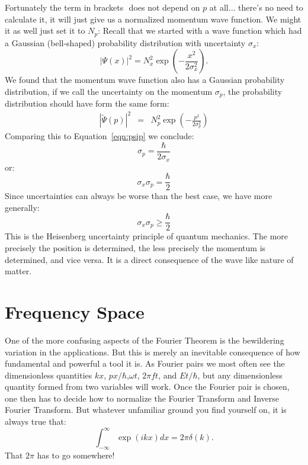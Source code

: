 \documentclass[12pt]{article}
\begin{document}
Fortunately the term in brackets ${}$ does not depend on $p$ at all... there's no need to calculate it, it will just give us a normalized momentum wave function.  We might it as well just set it to $N_p$:
Recall that we started with a wave function which had a Gaussian (bell-shaped) probability distribution with uncertainty $\sigma_x$:
\begin{displaymath}
|\Psi(x)|^2 = N_x^2 \exp\left(-\frac{x^2}{2\sigma_x^2}\right).
\end{displaymath}
We found that the momentum wave function also has a Gaussian probability distribution, if we call the uncertainty on the momentum $\sigma_p$, the probability distribution should have form the same form:
\begin{eqnarray*}
|\widetilde{\Psi}(p) |^2 &=& N_p^2 \exp\left(-\frac{p^2}{2 \sigma_p^2} \right)
\end{eqnarray*}
Comparing this to Equation~\ref{eqn:psip} we conclude:
\begin{displaymath}
\sigma_p = \frac{\hbar}{2 \sigma_x}
\end{displaymath}
or:
\begin{displaymath}
\sigma_x \sigma_p = \frac{\hbar}{2}
\end{displaymath}
Since uncertainties can always be worse than the best case, we have more generally:
\begin{displaymath}
\sigma_x \sigma_p \geq \frac{\hbar}{2}
\end{displaymath}
This is the Heisenberg uncertainty principle of quantum mechanics.  The more precisely the position is determined, the less precisely the momentum is determined, and vice versa.  It is a direct consequence of the wave like nature of matter.

\section{Frequency Space}

One of the more confusing aspects of the Fourier Theorem is the bewildering variation in the applications.  But this is merely an inevitable consequence of how fundamental and powerful a tool it is.  As Fourier pairs we most often see the dimensionless quantities $kx$, $px/\hbar$,$\omega t$, $2\pi f t$, and $Et/\hbar$, but any dimensionless quantity formed from two variables will work.  Once the Fourier pair is chosen, one then has to decide how to normalize the Fourier Transform and Inverse Fourier Transform.  But whatever unfamiliar ground you find yourself on, it is always true that:
\begin{displaymath}
\int^{\infty}_{-\infty} \exp(ikx) dx = 2\pi \delta(k).
\end{displaymath}
That $2\pi$ has to go somewhere!
\end{document}
